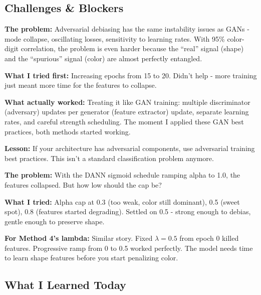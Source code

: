\documentclass[9pt,a4paper,twocolumn,twoside]{tau-class/tau}
\begin{document}
    \subsection{Challenges \& Blockers}

        \begin{tauenv}[frametitle={Challenge: Adversarial Training is Like GAN Training}]
            \textbf{The problem:} Adversarial debiasing has the same instability issues as GANs - mode collapse, oscillating losses, sensitivity to learning rates. With 95\% color-digit correlation, the problem is even harder because the ``real'' signal (shape) and the ``spurious'' signal (color) are almost perfectly entangled.

            \textbf{What I tried first:} Increasing epochs from 15 to 20. Didn't help - more training just meant more time for the features to collapse.

            \textbf{What actually worked:} Treating it like GAN training: multiple discriminator (adversary) updates per generator (feature extractor) update, separate learning rates, and careful strength scheduling. The moment I applied these GAN best practices, both methods started working.

            \textbf{Lesson:} If your architecture has adversarial components, use adversarial training best practices. This isn't a standard classification problem anymore.
        \end{tauenv}

        \begin{tauenv}[frametitle={Challenge: Finding the Right Alpha/Lambda Cap}]
            \textbf{The problem:} With the DANN sigmoid schedule ramping alpha to 1.0, the features collapsed. But how low should the cap be?

            \textbf{What I tried:} Alpha cap at 0.3 (too weak, color still dominant), 0.5 (sweet spot), 0.8 (features started degrading). Settled on 0.5 - strong enough to debias, gentle enough to preserve shape.

            \textbf{For Method 4's lambda:} Similar story. Fixed $\lambda = 0.5$ from epoch 0 killed features. Progressive ramp from 0 to 0.5 worked perfectly. The model needs time to learn shape features before you start penalizing color.
        \end{tauenv}

    \subsection{What I Learned Today}
\end{document}
